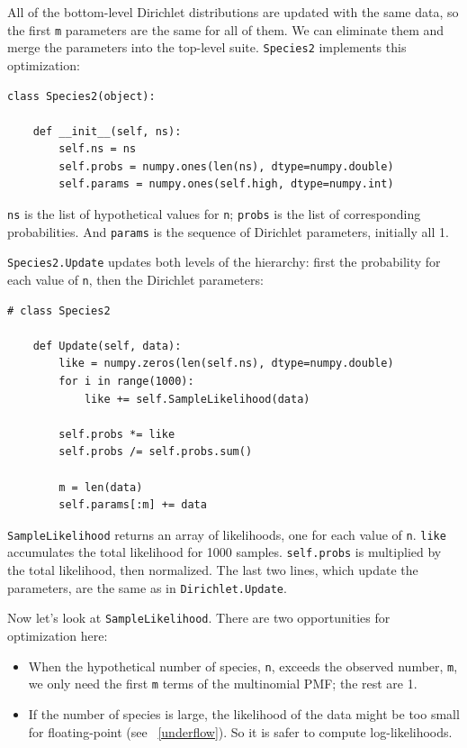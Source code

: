 \documentclass[12pt]{book}
\begin{document}
All of the bottom-level Dirichlet distributions are updated
with the same data, so the first {\tt m} parameters are the same for
all of them.  
We can eliminate them and merge the parameters into
the top-level suite.  {\tt Species2} implements this optimization:

\begin{verbatim}
class Species2(object):
    
    def __init__(self, ns):
        self.ns = ns
        self.probs = numpy.ones(len(ns), dtype=numpy.double)
        self.params = numpy.ones(self.high, dtype=numpy.int)
\end{verbatim}

{\tt ns} is the list of hypothetical values for {\tt n};
{\tt probs} is the list of corresponding probabilities.  And
{\tt params} is the sequence of Dirichlet parameters, initially
all 1.

{\tt Species2.Update} updates both levels of
the hierarchy: first the probability for each value of {\tt n},
then the Dirichlet parameters:

\begin{verbatim}
# class Species2

    def Update(self, data):
        like = numpy.zeros(len(self.ns), dtype=numpy.double)
        for i in range(1000):
            like += self.SampleLikelihood(data)

        self.probs *= like
        self.probs /= self.probs.sum()

        m = len(data)
        self.params[:m] += data
\end{verbatim}

{\tt SampleLikelihood} returns an array of likelihoods, one for each
value of {\tt n}.  {\tt like} accumulates the total likelihood for
1000 samples.  {\tt self.probs} is multiplied by the total likelihood,
then normalized.  The last two lines, which update the parameters,
are the same as in {\tt Dirichlet.Update}.

Now let's look at {\tt SampleLikelihood}.  There are two
opportunities for optimization here:

\begin{itemize}

\item When the hypothetical number of species, {\tt n},
exceeds the observed number, {\tt m}, we only need the first {\tt m}
terms of the multinomial PMF; the rest are 1.

\item If the number of species is large, the likelihood of the data
  might be too small for floating-point (see ~\ref{underflow}).  So it
  is safer to compute log-likelihoods.
   

\end{itemize}
\end{document}
